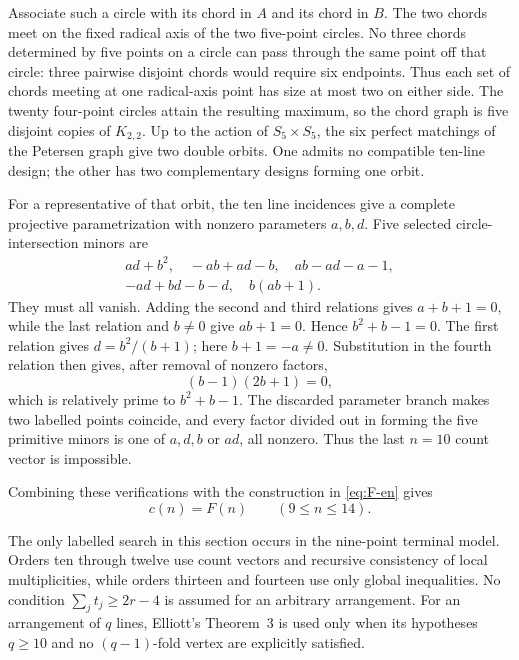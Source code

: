 Associate such a circle with its chord in $A$ and its chord in $B$.  The two
chords meet on the fixed radical axis of the two five-point circles.  No three
chords determined by five points on a circle can pass through the same point
off that circle: three pairwise disjoint chords would require six endpoints.
Thus each set of chords meeting at one radical-axis point has size at most two
on either side.  The twenty four-point circles attain the resulting maximum,
so the chord graph is five disjoint copies of $K_{2,2}$.  Up to the action of
$S_5\times S_5$, the six perfect matchings of the Petersen graph give two
double orbits.  One admits no compatible ten-line design; the other has two
complementary designs forming one orbit.

For a representative of that orbit, the ten line incidences give a complete
projective parametrization with nonzero parameters $a,b,d$.  Five selected
circle-intersection minors are
\begin{gather*}
 ad+b^2,\quad -ab+ad-b,\quad ab-ad-a-1,\\
 -ad+bd-b-d,\quad b(ab+1).
\end{gather*}
They must all vanish.  Adding the second and third relations gives
$a+b+1=0$, while the last relation and $b\ne0$ give $ab+1=0$.  Hence
$b^2+b-1=0$.  The first relation gives
$d=b^2/(b+1)$; here $b+1=-a\ne0$.  Substitution in the fourth relation then
gives, after removal of nonzero factors,
\[
 (b-1)(2b+1)=0,
\]
which is relatively prime to $b^2+b-1$.  The discarded parameter branch makes
two labelled points coincide, and every factor divided out in forming the
five primitive minors is one of $a,d,b$ or $ad$, all nonzero.  Thus the last
$n=10$ count vector is impossible.

Combining these verifications with the construction in \eqref{eq:F-en} gives
\[
 c(n)=F(n)\qquad(9\le n\le14).
\]

\begin{remark}
The only labelled search in this section occurs in the nine-point terminal
model.  Orders ten through twelve use count vectors and recursive consistency
of local multiplicities, while orders thirteen and fourteen use only global inequalities.
No condition $\sum_jt_j\ge2r-4$ is assumed for an arbitrary arrangement.
For an arrangement of $q$ lines, Elliott's Theorem~3 is used only when its
hypotheses $q\ge10$ and no $(q-1)$-fold vertex are explicitly satisfied.
\end{remark}
